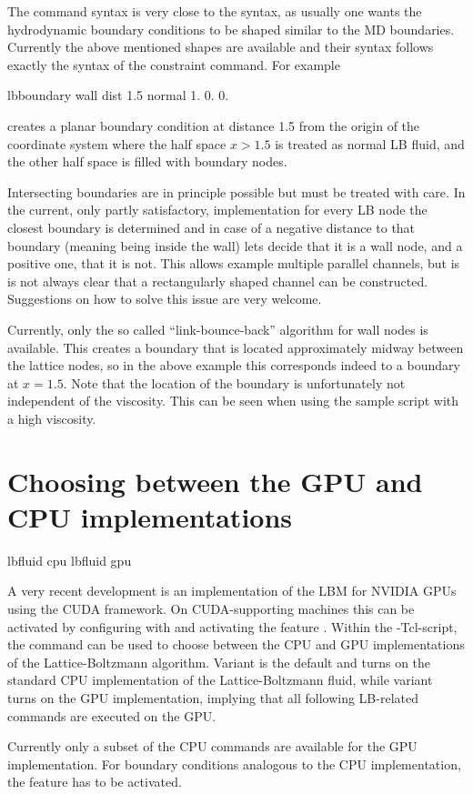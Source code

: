 The  command syntax is very close to the
 syntax, as usually one wants the hydrodynamic
boundary conditions to be shaped similar to the MD
boundaries. Currently the above mentioned shapes are available and
their syntax follows exactly the syntax of the constraint command. For
example
\begin{tclcode}
  lbboundary wall dist 1.5 normal 1. 0. 0. 
\end{tclcode}
creates a planar boundary condition at distance 1.5 from the origin of
the coordinate system where the half space $x>1.5$ is treated as
normal LB fluid, and the other half space is filled with boundary
nodes.

Intersecting boundaries are in principle possible but must be treated
with care. In the current, only partly satisfactory, implementation for
every LB node the closest boundary is determined and in case of a
negative distance to that boundary (meaning being inside the wall)
lets \es decide that it is a wall node, and a positive one, that it is
not.  This allows example multiple parallel channels, but is is not
always clear that a rectangularly shaped channel can be
constructed. Suggestions on how to solve this issue are very welcome.

Currently, only the so called ``link-bounce-back'' algorithm for wall
nodes is available. This creates a boundary that is located
approximately midway between the lattice nodes, so in the above
example this corresponds indeed to a boundary at $x=1.5$. Note that
the location of the boundary is unfortunately not independent of the
viscosity. This can \eg be seen when using the sample script
 with a high viscosity.

\section{Choosing between the GPU and CPU implementations}
\begin{essyntax}
   lbfluid cpu
   lbfluid gpu
  \begin{features}
  \end{features}
\end{essyntax}

A very recent development is an implementation of the LBM for NVIDIA
GPUs using the CUDA framework.  On CUDA-supporting machines this can
be activated by configuring with  and activating the feature .
Within the \es-Tcl-script, the  command can be used to
choose between the CPU and GPU implementations of the
Lattice-Boltzmann algorithm.  Variant  is the default and
turns on the standard CPU implementation of the Lattice-Boltzmann
fluid, while variant  turns on the GPU implementation,
implying that all following LB-related commands are executed on the
GPU. 

Currently only a subset of the CPU commands are available for the GPU
implementation.  For boundary conditions analogous to the CPU
implementation, the feature  has to be
activated.

